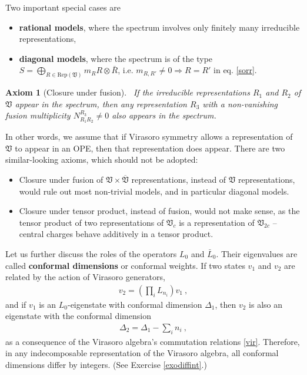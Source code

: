 \documentclass[12pt, a4paper, notitlepage, twoside]{report}
\numberwithin{equation}{section}
\theoremstyle{break}
\newtheorem{hyp}{Axiom}[chapter]
\begin{document}
Two important special cases are
\begin{itemize}
\item \textbf{\boldmath rational models}, where the spectrum involves only finitely many irreducible representations,
 \item \textbf{\boldmath diagonal models}, where the spectrum is of the type $S=\bigoplus_{R\in \text{Rep}(\mathfrak{V})} m_R R\otimes \bar{R}$, i.e. $m_{R,R'}\neq 0 \Rightarrow R=R'$ in eq. \eqref{sorr}.
\end{itemize}

\begin{hyp}[Closure under fusion]
~\label{ax:cuf}
If the irreducible representations $R_1$ and $R_2$ of $\mathfrak{V}$ appear in the spectrum, then any representation $R_3$ with a non-vanishing fusion multiplicity $N_{R_1R_2}^{R_3}\neq 0$ also appears in the spectrum. 
\end{hyp} 
\noindent
In other words, we assume that if Virasoro symmetry allows a representation of $\mathfrak{V}$ to appear in an OPE, then that representation does appear.
There are two similar-looking axioms, which should not be adopted:
\begin{itemize}
 \item Closure under fusion of $\mathfrak{V}\times \overline{\mathfrak{V}}$ representations, instead of $\mathfrak{V}$ representations, would rule out most non-trivial models, and in particular diagonal models. 
\item Closure under tensor product, instead of fusion, would not make sense, as the tensor product of two representations of $\mathfrak{V}_c$ is a representation of $\mathfrak{V}_{2c}$ -- central charges behave additively in a tensor product. 
\end{itemize}

Let us further discuss the roles of the operators $L_0$ and $\bar L_0$. Their eigenvalues are called \textbf{\boldmath conformal dimensions} or conformal weights. If 
two states $v_1$ and $v_2$ are related by the action of Virasoro generators,
\begin{align}
 v_2 = \left(\prod_i L_{n_i}\right) v_1\ ,
\label{vovt}
\end{align}
and if $v_1$ is an $L_0$-eigenstate with conformal dimension $\Delta_1$, then $v_2$ is also an eigenstate with the conformal dimension
\begin{align}
 \Delta_2 = \Delta_1 - \sum_i n_i\ ,
\label{ddsn}
\end{align}
as a consequence of the Virasoro algebra's commutation relations \eqref{vir}. Therefore, in any indecomposable representation of the Virasoro algebra, all conformal dimensions differ by integers. (See Exercise \ref{exodiffint}.)
\end{document}
